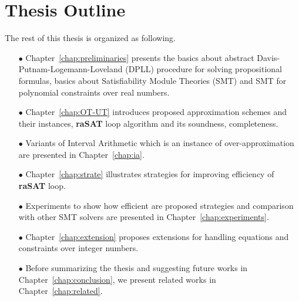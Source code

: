 \section{Thesis Outline}
The rest of this thesis is organized as following.
\begin{itemize}
\item [$\bullet$] Chapter~\ref{chap:preliminaries} presents the basics about abstract Davis-Putnam-Logemann-Loveland (DPLL) procedure for solving propositional formulas, basics about Satisfiability Module Theories (SMT) and SMT for polynomial constraints over real numbers.
\item [$\bullet$] Chapter~\ref{chap:OT-UT} introduces proposed approximation schemes and their instances, \textbf{raSAT} loop algorithm and its soundness, completeness.
\item[$\bullet$] Variants of Interval Arithmetic which is an instance of over-approximation are presented in Chapter~\ref{chap:ia}.
\item[$\bullet$] Chapter~\ref{chap:strate} illustrates strategies for improving efficiency of \textbf{raSAT} loop.
\item[$\bullet$] Experiments to show how efficient are proposed strategies and comparison with other SMT solvers are presented in Chapter~\ref{chap:experiments}.
\item[$\bullet$] Chapter~\ref{chap:extension} proposes extensions for handling equations and constraints over integer numbers.
\item[$\bullet$] Before summarizing the thesis and suggesting future works in Chapter~\ref{chap:conclusion}, we present related works in Chapter~\ref{chap:related}.
\end{itemize}